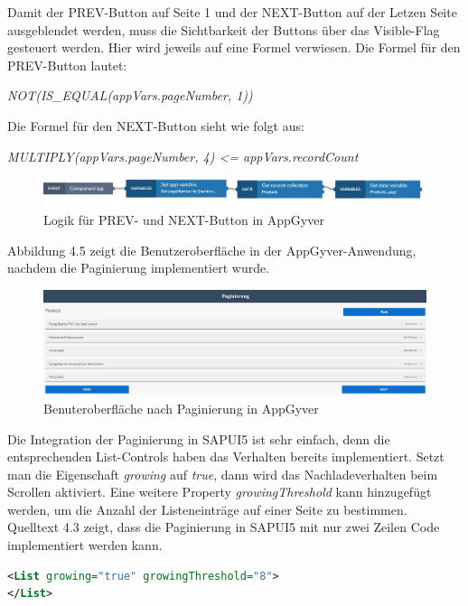 Damit der PREV-Button auf Seite 1 und der NEXT-Button auf der Letzen Seite ausgeblendet werden, muss die Sichtbarkeit der Buttons über das Visible-Flag gesteuert werden. Hier wird jeweils auf eine Formel verwiesen. Die Formel für den PREV-Button lautet:  

\textit{\footnotesize NOT(IS\_EQUAL(appVars.pageNumber, 1))}

Die Formel für den NEXT-Button sieht wie folgt aus:

\textit{\footnotesize MULTIPLY(appVars.pageNumber, 4) <= appVars.recordCount}

\begin{figure}[htbp]
 \centering
 \includegraphics[width=1.0\textwidth]{Bilder/appgyver/4_4_Logik_PREV_und_NEXT.jpg}
 \caption{Logik für PREV- und NEXT-Button in AppGyver}
\end{figure}

Abbildung 4.5 zeigt die Benutzeroberfläche in der AppGyver-Anwendung, nachdem die Paginierung implementiert wurde.

\begin{figure}[htbp]
 \centering
 \includegraphics[width=1.0\textwidth]{Bilder/appgyver/4_5_AppGyver_pagnierung.jpg}
 \caption{Benuteroberfläche nach Paginierung in AppGyver }
\end{figure}

Die Integration der Paginierung in SAPUI5 ist sehr einfach, denn die entsprechenden List-Controls haben das Verhalten bereits implementiert. Setzt man die Eigenschaft \textit{growing} auf \textit{true}, dann wird das Nachladeverhalten beim Scrollen aktiviert. Eine weitere Property \textit{growingThreshold} kann hinzugefügt werden, um die Anzahl der Listeneinträge auf einer Seite zu bestimmen. Quelltext 4.3 zeigt, dass die Paginierung in SAPUI5 mit nur zwei Zeilen Code implementiert werden kann.
\begin{lstlisting}[language=XML,  caption=Implementierung der Paginierung in der \texttt{Main.view.xml}]
<List growing="true" growingThreshold="8">
</List>
\end{lstlisting}

